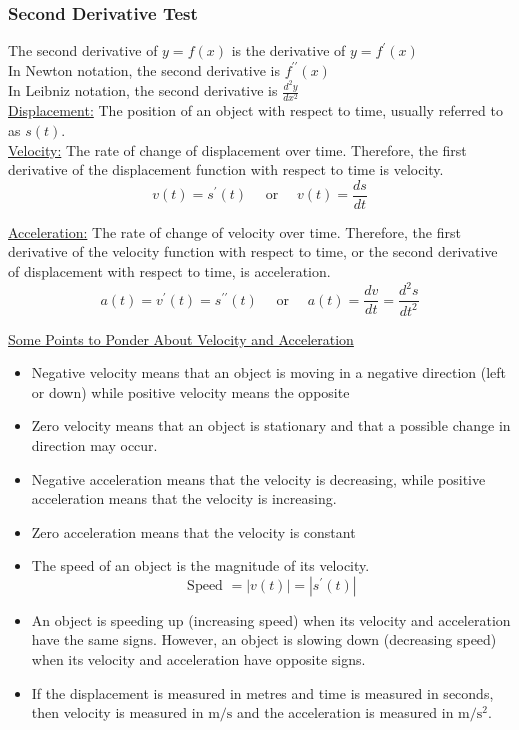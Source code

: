\documentclass{article}
\begin{document}
\subsubsection*{Second Derivative Test}
The second derivative of $y=f(x)$ is the derivative of $y=f^{\prime}(x)$\\
In Newton notation, the second derivative is $f^{\prime \prime}(x)$\\
In Leibniz notation, the second derivative is $\frac{d^2 y}{d x^2}$\\

\underline{Displacement:} The position of an object with respect to time, usually referred to as $s(t)$.\\

\underline{Velocity:} The rate of change of displacement over time. Therefore, the first derivative of the displacement function with respect to time is velocity.\\
$$
v(t)=s^{\prime}(t) \quad \text { or } \quad v(t)=\frac{d s}{d t}
$$

\underline{Acceleration:} The rate of change of velocity over time. Therefore, the first derivative of the velocity function with respect to time, or the second derivative of displacement with respect to time, is acceleration.\\
$$
a(t)=v^{\prime}(t)=s^{\prime \prime}(t) \quad \text { or } \quad a(t)=\frac{d v}{d t}=\frac{d^2 s}{d t^2}
$$

\underline{Some Points to Ponder About Velocity and Acceleration}
\begin{itemize}
\item Negative velocity means that an object is moving in a negative direction (left or down) while positive velocity means the opposite
\item Zero velocity means that an object is stationary and that a possible change in direction may occur.
\item Negative acceleration means that the velocity is decreasing, while positive acceleration means that the velocity is increasing.
\item Zero acceleration means that the velocity is constant
\item The speed of an object is the magnitude of its velocity.
$$
\text {Speed }=|v(t)|=\left|s^{\prime}(t)\right|
$$
\item An object is speeding up (increasing speed) when its velocity and acceleration have the same signs. However, an object is slowing down (decreasing speed) when its velocity and acceleration have opposite signs.
\item If the displacement is measured in metres and time is measured in seconds, then velocity is measured in $\mathrm{m} / \mathrm{s}$ and the acceleration is measured in $\mathrm{m} / \mathrm{s}^2$.
\end{itemize}
\end{document}
